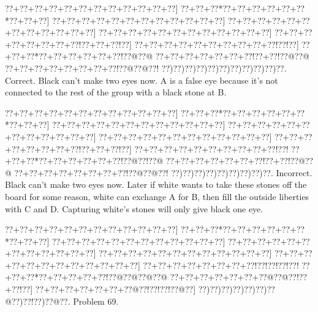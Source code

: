 \documentclass[a5paper]{article}
\begin{document}
\begin{center}
{\goo
\0??+\0??+\0??+\0??+\0??+\0??+\0??+\0??+\0??+\0??+\0??+\0??]
\0??+\0??+\0??*\0??+\0??+\0??+\0??+\0??+\0??*\0??+\0??+\0??]
\0??+\0??+\0??+\0??+\0??+\0??+\0??+\0??+\0??+\0??+\0??+\0??]
\0??+\0??+\0??+\0??+\0??+\0??+\0??+\0??+\0??+\0??+\0??+\0??]
\0??+\0??+\0??+\0??+\0??+\0??+\0??+\0??+\0??+\0??+\0??+\0??]
\0??+\0??+\0??+\0??+\0??+\0??+\0??+\0??!\0??+\0??+\0??!\0??]
\0??+\0??+\0??+\0??+\0??+\0??+\0??+\0??+\0??+\0??!\0??!\0??]
\0??+\0??+\0??*\0??+\0??+\0??+\0??+\0??+\0??!\0??@\0??@
\0??+\0??+\0??+\0??+\0??+\0??+\0??!\0??+\0??!\0??@\0??@
\0??+\0??+\0??+\0??+\0??+\0??+\0??+\0??!\0??@\0??@\0??!
\0??)\0??)\0??)\0??)\0??)\0??)\0??)\0??)\0??)\0??)\0??.
}
Correct. Black can't make two eyes now. A is a false eye because it's not connected to the rest of the group with a black stone at B.

\end{center}
\begin{center}
{\goo
\0??+\0??+\0??+\0??+\0??+\0??+\0??+\0??+\0??+\0??+\0??+\0??]
\0??+\0??+\0??*\0??+\0??+\0??+\0??+\0??+\0??*\0??+\0??+\0??]
\0??+\0??+\0??+\0??+\0??+\0??+\0??+\0??+\0??+\0??+\0??+\0??]
\0??+\0??+\0??+\0??+\0??+\0??+\0??+\0??+\0??+\0??+\0??+\0??]
\0??+\0??+\0??+\0??+\0??+\0??+\0??+\0??+\0??+\0??+\0??+\0??]
\0??+\0??+\0??+\0??+\0??+\0??+\0??+\0??!\0??+\0??+\0??!\0??]
\0??+\0??+\0??+\0??+\0??+\0??+\0??+\0??+\0??+\0??!\0??!
\0??+\0??+\0??*\0??+\0??+\0??+\0??+\0??+\0??!\0??@\0??!\0??@
\0??+\0??+\0??+\0??+\0??+\0??+\0??!\0??+\0??!\0??@\0??@
\0??+\0??+\0??+\0??+\0??+\0??+\0??+\0??!\0??@\0??@\0??!
\0??)\0??)\0??)\0??)\0??)\0??)\0??)\0??)\0??.
}
Incorrect. Black can't make two eyes now. Later if white wants to take these stones off the board for some reason, white can exchange A for B, then fill the outside liberties with C and D. Capturing white's stones will only give black one eye.

\end{center}
\newpage
\begin{center}
{\goo
\0??+\0??+\0??+\0??+\0??+\0??+\0??+\0??+\0??+\0??+\0??+\0??]
\0??+\0??+\0??*\0??+\0??+\0??+\0??+\0??+\0??*\0??+\0??+\0??]
\0??+\0??+\0??+\0??+\0??+\0??+\0??+\0??+\0??+\0??+\0??+\0??]
\0??+\0??+\0??+\0??+\0??+\0??+\0??+\0??+\0??+\0??+\0??+\0??]
\0??+\0??+\0??+\0??+\0??+\0??+\0??+\0??+\0??+\0??+\0??+\0??]
\0??+\0??+\0??+\0??+\0??+\0??+\0??+\0??+\0??+\0??+\0??+\0??]
\0??+\0??+\0??+\0??+\0??+\0??+\0??+\0??!\0??!\0??!\0??!\0??!
\0??+\0??+\0??*\0??+\0??+\0??+\0??+\0??!\0??@\0??@\0??@\0??@
\0??+\0??+\0??+\0??+\0??+\0??+\0??@\0??@\0??!\0??+\0??!\0??]
\0??+\0??+\0??+\0??+\0??+\0??+\0??@\0??!\0??!\0??!\0??@\0??]
\0??)\0??)\0??)\0??)\0??)\0??)\0??@\0??)\0??!\0??)\0??@\0??.
}
Problem 69.

\end{center}
\end{document}
